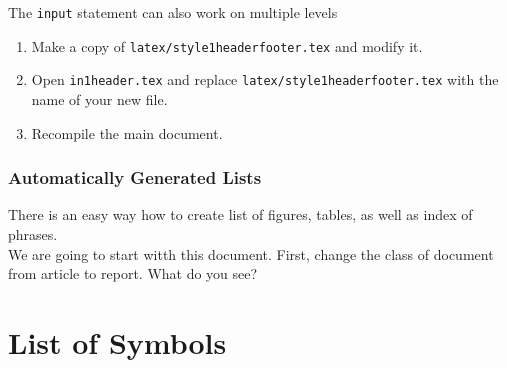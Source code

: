 \documentclass[a4paper,10pt]{report} %
\begin{document}
The \texttt{input} statement can also work on multiple levels
\begin{enumerate}
    \item Make a copy of \texttt{latex/style1headerfooter.tex} and modify it.
    \item Open \texttt{in1header.tex} and replace \texttt{latex/style1headerfooter.tex} with the name of your new file.
    \item Recompile the main document.
\end{enumerate}



\subsection{Automatically Generated Lists}\label{sec:automatic}
There is an easy way how to create list of figures, tables, as well as index of phrases.\\


 We are going to start witth this document. First, change the class of document from article to report. What do you see?\\

 


 \maketitle
   \let\clearpage\relax 
   \tableofcontents
    \label{contents}
    \listoftables    
    \listoffigures
    \chapter*{List of Symbols}
     
 \newpage


\end{document}
